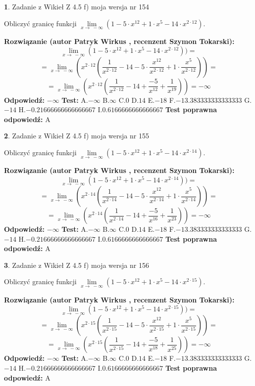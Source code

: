 \documentclass[12pt, a4paper]{article}
\theoremstyle{definition} %
\newtheorem{zad}{}
\newcommand{\zadStart}[1]{\begin{zad}#1\newline}
\newcommand{\zadStop}{\end{zad}}
\newcommand{\rozwStart}[2]{\noindent \textbf{Rozwiązanie (autor #1 , recenzent #2): }\newline}
\newcommand{\rozwStop}{\newline}
\newcommand{\odpStart}{\noindent \textbf{Odpowiedź:}\newline}
\newcommand{\odpStop}{\newline}
\newcommand{\testStart}{\noindent \textbf{Test:}\newline}
\newcommand{\testStop}{\newline}
\newcommand{\kluczStart}{\noindent \textbf{Test poprawna odpowiedź:}\newline}
\newcommand{\kluczStop}{\newline}
\begin{document}
\zadStart{Zadanie z Wikieł Z 4.5 f) moja wersja nr 154}


Obliczyć granicę funkcji  $\lim\limits_{x\to\ -\infty}(1 - 5 \cdot x^{12}+1 \cdot x^{5}- 14 \cdot x^{2\cdot12})$.
\zadStop
\rozwStart{Patryk Wirkus}{Szymon Tokarski}
$$\lim\limits_{x\to\ -\infty}(1 - 5 \cdot x^{12}+1 \cdot x^{5}- 14 \cdot x^{2\cdot12}))=$$
$$=\lim\limits_{x\to\ -\infty}(x^{2\cdot12}(\frac{1}{x^{2\cdot12}}-14 -5 \cdot \frac{x^{12}}{x^{2\cdot12}}+1 \cdot \frac{x^{5}}{x^{2\cdot12}}))=$$
$$=\lim\limits_{x\to\ -\infty}(x^{2\cdot12}(\frac{1}{x^{2\cdot12}}-14 + \frac{-5}{x^{12}}+ \frac{1}{x^{19}}))=-\infty$$
\rozwStop
\odpStart
$-\infty$
\odpStop
\testStart
A.$-\infty$ B.$\infty$ C.$0$ D.$14$ E.$-18$
F.$-13.383333333333333$ G.$-14$
H.$-0.21666666666666667$
I.$0.6166666666666667$
\testStop
\kluczStart
A
\kluczStop



\zadStart{Zadanie z Wikieł Z 4.5 f) moja wersja nr 155}


Obliczyć granicę funkcji  $\lim\limits_{x\to\ -\infty}(1 - 5 \cdot x^{12}+1 \cdot x^{5}- 14 \cdot x^{2\cdot14})$.
\zadStop
\rozwStart{Patryk Wirkus}{Szymon Tokarski}
$$\lim\limits_{x\to\ -\infty}(1 - 5 \cdot x^{12}+1 \cdot x^{5}- 14 \cdot x^{2\cdot14}))=$$
$$=\lim\limits_{x\to\ -\infty}(x^{2\cdot14}(\frac{1}{x^{2\cdot14}}-14 -5 \cdot \frac{x^{12}}{x^{2\cdot14}}+1 \cdot \frac{x^{5}}{x^{2\cdot14}}))=$$
$$=\lim\limits_{x\to\ -\infty}(x^{2\cdot14}(\frac{1}{x^{2\cdot14}}-14 + \frac{-5}{x^{16}}+ \frac{1}{x^{23}}))=-\infty$$
\rozwStop
\odpStart
$-\infty$
\odpStop
\testStart
A.$-\infty$ B.$\infty$ C.$0$ D.$14$ E.$-18$
F.$-13.383333333333333$ G.$-14$
H.$-0.21666666666666667$
I.$0.6166666666666667$
\testStop
\kluczStart
A
\kluczStop



\zadStart{Zadanie z Wikieł Z 4.5 f) moja wersja nr 156}


Obliczyć granicę funkcji  $\lim\limits_{x\to\ -\infty}(1 - 5 \cdot x^{12}+1 \cdot x^{5}- 14 \cdot x^{2\cdot15})$.
\zadStop
\rozwStart{Patryk Wirkus}{Szymon Tokarski}
$$\lim\limits_{x\to\ -\infty}(1 - 5 \cdot x^{12}+1 \cdot x^{5}- 14 \cdot x^{2\cdot15}))=$$
$$=\lim\limits_{x\to\ -\infty}(x^{2\cdot15}(\frac{1}{x^{2\cdot15}}-14 -5 \cdot \frac{x^{12}}{x^{2\cdot15}}+1 \cdot \frac{x^{5}}{x^{2\cdot15}}))=$$
$$=\lim\limits_{x\to\ -\infty}(x^{2\cdot15}(\frac{1}{x^{2\cdot15}}-14 + \frac{-5}{x^{18}}+ \frac{1}{x^{25}}))=-\infty$$
\rozwStop
\odpStart
$-\infty$
\odpStop
\testStart
A.$-\infty$ B.$\infty$ C.$0$ D.$14$ E.$-18$
F.$-13.383333333333333$ G.$-14$
H.$-0.21666666666666667$
I.$0.6166666666666667$
\testStop
\kluczStart
A
\kluczStop
\end{document}

